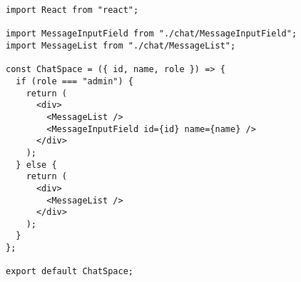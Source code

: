\begin{verbatim}
import React from "react";

import MessageInputField from "./chat/MessageInputField";
import MessageList from "./chat/MessageList";

const ChatSpace = ({ id, name, role }) => {
  if (role === "admin") {
    return (
      <div>
        <MessageList />
        <MessageInputField id={id} name={name} />
      </div>
    );
  } else {
    return (
      <div>
        <MessageList />
      </div>
    );
  }
};

export default ChatSpace;
\end{verbatim}